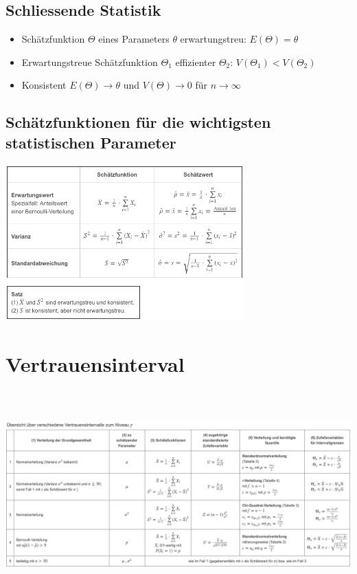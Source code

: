 \documentclass[8pt,a4paper]{scrartcl}
\begin{document}
\begin{multicols*}{3}
			\section{Schliessende Statistik}
			
			 	\begin{itemize}\itemsep0pt				
					\item Schätzfunktion $\Theta$ eines Parameters $\theta$ erwartungstreu: $E(\Theta)=\theta $
					\item Erwartungstreue Schätzfunktion $\Theta_{1}$ effizienter $\Theta_{2}$: $ V(\Theta_{1})<V(\Theta_{2})$
					\item Konsistent $E(\Theta)\rightarrow\theta$ und $V(\Theta)\rightarrow 0$ für $n\rightarrow \infty$
				\end{itemize}	
				\subsection{Schätzfunktionen für die wichtigsten statistischen Parameter}
					\includegraphics[height=6cm]{img/schaetz1.png} 



\end{multicols*}


\setlength{\columnseprule}{0.4pt}
\section{Vertrauensinterval}
\includegraphics[height=8cm]{img/Vertrauensinterval.png}
\end{document}
